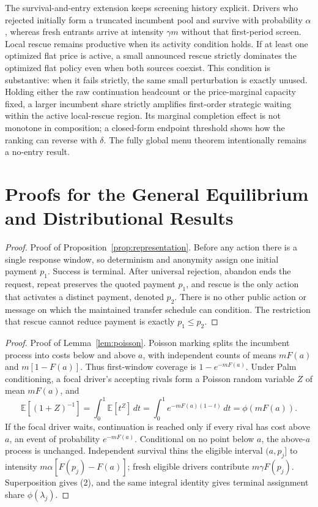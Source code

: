 \documentclass[mnsc,blindrev]{informs3}
\newcommand{\E}{\mathbb E}
\newcommand{\ph}{\phi}
\begin{document}
The survival-and-entry extension keeps screening history explicit.  Drivers
who rejected initially form a truncated incumbent pool and survive with
probability $\alpha$, whereas fresh entrants arrive at intensity $\gamma m$
without that first-period screen.  Local rescue remains productive when its
activity condition holds.  If at least one optimized flat price is active, a
small announced rescue strictly dominates the optimized flat policy even when
both sources coexist.  This condition is substantive: when it fails strictly,
the same small perturbation is exactly unused.  Holding either the raw
continuation headcount or the price-marginal capacity fixed, a larger
incumbent share strictly amplifies first-order strategic waiting within the
active local-rescue region.  Its marginal completion
effect is not monotone in composition; a closed-form endpoint threshold shows
how the ranking can reverse with $\delta$.  The fully global menu theorem
intentionally remains a no-entry result.




\ECSwitch
{}
\renewcommand{\theHsection}{EC.\arabic{section}}

\section{Proofs for the General Equilibrium and Distributional Results}
\label{app:equilibrium}

\begin{proof}{Proof of Proposition~\ref{prop:representation}.}
Before any action there is a single response window, so determinism and
anonymity assign one initial payment \(p_1\).  Success is terminal.  After
universal rejection, abandon ends the request, repeat preserves the quoted
payment \(p_1\), and rescue is the only action that activates a distinct
payment, denoted \(p_2\).  There is no other public action or message on which
the maintained transfer schedule can condition.  The restriction that rescue
cannot reduce payment is exactly \(p_1\le p_2\).
\Halmos\end{proof}

\begin{proof}{Proof of Lemma~\ref{lem:poisson}.}
Poisson marking splits the incumbent process into costs below and above \(a\),
with independent counts of means \(mF(a)\) and \(m[1-F(a)]\).  Thus
first-window coverage is \(1-e^{-mF(a)}\).  Under Palm conditioning, a focal
driver's accepting rivals form a Poisson random variable \(Z\) of mean
\(mF(a)\), and
\[
 \E[(1+Z)^{-1}]
 =\int_0^1\E[t^Z]\,dt
 =\int_0^1e^{-mF(a)(1-t)}\,dt=\ph(mF(a)).
\]
If the focal driver waits, continuation is reached only if every rival has
cost above \(a\), an event of probability \(e^{-mF(a)}\).  Conditional on no
point below \(a\), the above-\(a\) process is unchanged.  Independent survival
thins the eligible interval \((a,p_j]\) to intensity
\(m\alpha[F(p_j)-F(a)]\); fresh eligible drivers contribute
\(m\gamma F(p_j)\).  Superposition gives (2), and the same integral identity
gives terminal assignment share \(\ph(\lambda_j)\).
\Halmos\end{proof}
\end{document}
